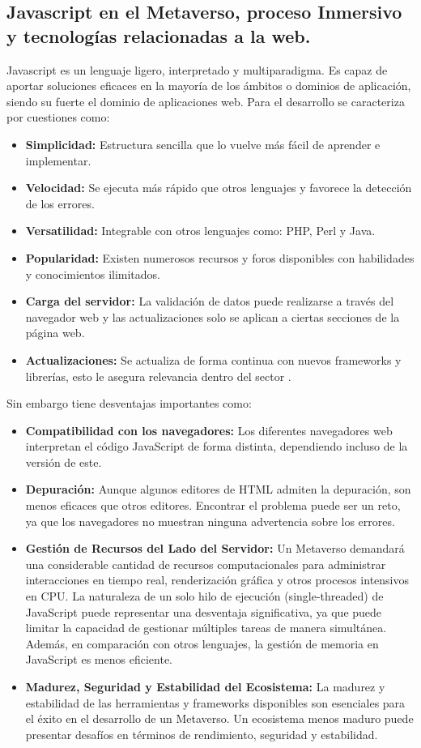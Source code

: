 \documentclass[a4paper,10pt]{article}
\begin{document}
	\subsection{Javascript en el Metaverso, proceso Inmersivo y tecnologías relacionadas a la web.}
	{\normalsize Javascript es un lenguaje ligero, interpretado y multiparadigma. Es capaz de aportar soluciones eficaces en la mayoría de los ámbitos o dominios de aplicación, siendo su fuerte el dominio de aplicaciones web.
		Para el desarrollo se caracteriza por cuestiones como:
		
		\begin{itemize}
			\item \textbf{Simplicidad:} Estructura sencilla que lo vuelve más fácil de aprender e implementar.
			\item \textbf{Velocidad:} Se ejecuta más rápido que otros lenguajes y favorece la detección de los errores.
			\item \textbf{Versatilidad:} Integrable con otros lenguajes como: PHP, Perl y Java.
			\item \textbf{Popularidad:} Existen numerosos recursos y foros disponibles con habilidades y conocimientos ilimitados.
			\item \textbf{Carga del servidor:} La validación de datos puede realizarse a través del navegador web y las actualizaciones solo se aplican a ciertas secciones de la página web.
			\item \textbf{Actualizaciones:} Se actualiza de forma continua con nuevos frameworks y librerías, esto le asegura relevancia dentro del sector \parencite{ceei-2022}.
		\end{itemize}
		Sin embargo tiene desventajas importantes como:
		\begin{itemize}
			\item \textbf{Compatibilidad con los navegadores:} Los diferentes navegadores web interpretan el código JavaScript de forma distinta, dependiendo incluso de la versión de este.
			\item \textbf{Depuración:} Aunque algunos editores de HTML admiten la depuración, son menos eficaces que otros editores. Encontrar el problema puede ser un reto, ya que los navegadores no muestran ninguna advertencia sobre los errores.
			\item \textbf{Gestión de Recursos del Lado del Servidor:} 
			Un Metaverso demandará una considerable cantidad de recursos computacionales para administrar interacciones en tiempo real, renderización gráfica y otros procesos intensivos en CPU. La naturaleza de un solo hilo de ejecución (single-threaded) de JavaScript puede representar una desventaja significativa, ya que puede limitar la capacidad de gestionar múltiples tareas de manera simultánea. Además, en comparación con otros lenguajes, la gestión de memoria en JavaScript es menos eficiente.
			\item \textbf{Madurez, Seguridad y Estabilidad del Ecosistema:}
			La madurez y estabilidad de las herramientas y frameworks disponibles son esenciales para el éxito en el desarrollo de un Metaverso. Un ecosistema menos maduro puede presentar desafíos en términos de rendimiento, seguridad y estabilidad.
			

\end{itemize}}
\end{document}
